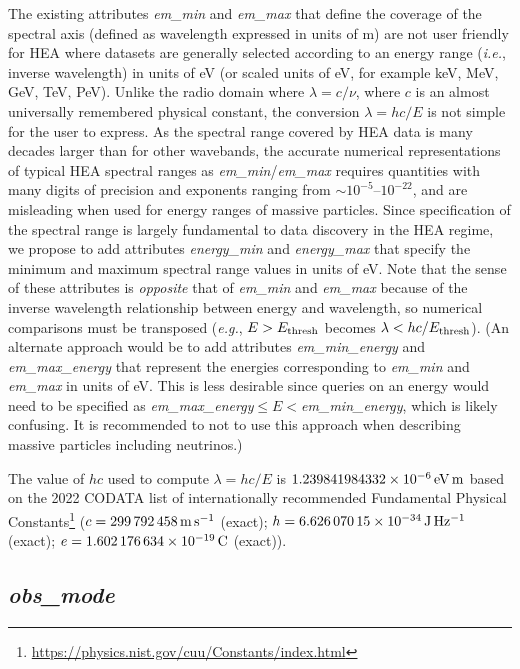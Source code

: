 \documentclass[11pt,a4paper]{ivoa}
\begin{document}
The existing attributes {\em em\_min\/} and {\em em\_max\/} that define the coverage of the spectral axis (defined as wavelength expressed in units of m) are not user friendly for \gls{HEA} where datasets are generally selected according to an energy range ({\em i.e.\/}, inverse wavelength) in units of eV (or scaled units of eV, for example keV, MeV, GeV, TeV, PeV). Unlike the radio domain where $\lambda = c/\nu$, where $c$ is an almost universally remembered physical constant, the conversion $\lambda = hc/E$ is not simple for the user to express. As the spectral range covered by \gls{HEA} data is many decades larger than for other wavebands, the accurate numerical representations of typical \gls{HEA} spectral ranges as {\em em\_min\/}/{\em em\_max\/} requires quantities with many digits of precision and exponents ranging from $\sim\!10^{-5}$--$10^{-22}$, and are misleading when used for energy ranges of massive particles.  Since specification of the spectral range is largely fundamental to data discovery in the \gls{HEA} regime, we propose to add attributes {\em energy\_min\/} and {\em energy\_max\/} that specify the minimum and maximum spectral range values in units of eV\null. Note that the sense of these attributes is {\em opposite\/} that of {\em em\_min\/} and {\em em\_max\/} because of the inverse wavelength relationship between energy and wavelength, so numerical comparisons must be transposed ({\em e.g.\/}, $E>E_{\rm thresh}$ becomes $\lambda<hc/E_{\rm thresh}$).  (An alternate approach would be to add attributes {\em em\_min\_energy\/} and {\em em\_max\_energy\/} that represent the energies corresponding to {\em em\_min\/} and {\em em\_max\/} in units of eV\null. This is less desirable since queries on an energy would need to be specified as {\em em\_max\_energy\/}${}\leq E <{}${\em em\_min\_energy\/}, which is likely confusing. It is recommended to not to use this approach when describing massive particles including neutrinos.)

The value of $hc$ used to compute $\lambda = hc/E$ is $1.239841984332\times10^{-6}\rm \,eV\,m$ based on the 2022 CODATA list of internationally recommended Fundamental Physical Constants\footnote{\url{https://physics.nist.gov/cuu/Constants/index.html}} ($c = 299\,792\,458\rm \,m\,s^{-1}$ (exact); $h = 6.626\,070\,15\times10^{-34}\rm \,J\,Hz^{-1}$ (exact); $e = 1.602\,176\,634\times10^{-19}\rm \,C$ (exact)). 

\subsection{{\em obs\_mode}}
\end{document}
